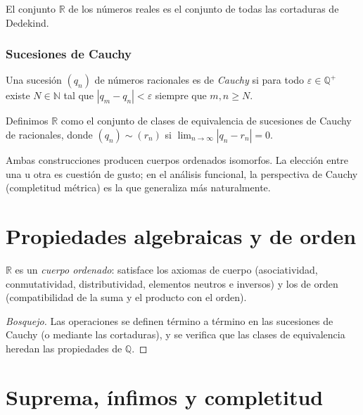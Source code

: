 \begin{definition}
\label{def:reales-dedekind}
El conjunto $\mathbb{R}$ de los números reales es el conjunto de todas las cortaduras de Dedekind.
\end{definition}

\subsubsection{Sucesiones de Cauchy}

\begin{definition}
\label{def:cauchy-racionales}
Una sucesión $(q_n)$ de números racionales es de \emph{Cauchy} si para todo $\varepsilon\in\mathbb{Q}^+$ existe $N\in\mathbb{N}$ tal que $|q_m-q_n|<\varepsilon$ siempre que $m,n\geq N$.
\end{definition}

\begin{definition}
\label{def:reales-cantor}
Definimos $\mathbb{R}$ como el conjunto de clases de equivalencia de sucesiones de Cauchy de racionales, donde $(q_n)\sim (r_n)$ si $\lim_{n\to\infty}|q_n-r_n|=0$.
\end{definition}

Ambas construcciones producen cuerpos ordenados isomorfos. La elección entre una u otra es cuestión de gusto; en el análisis funcional, la perspectiva de Cauchy (completitud métrica) es la que generaliza más naturalmente.

\section{Propiedades algebraicas y de orden}

\begin{theorem}
\label{teo:cuerpo-ordenado}
$\mathbb{R}$ es un \emph{cuerpo ordenado}: satisface los axiomas de cuerpo (asociatividad, conmutatividad, distributividad, elementos neutros e inversos) y los de orden (compatibilidad de la suma y el producto con el orden).
\end{theorem}

\begin{proof}[Bosquejo]
Las operaciones se definen término a término en las sucesiones de Cauchy (o mediante las cortaduras), y se verifica que las clases de equivalencia heredan las propiedades de $\mathbb{Q}$.
\end{proof}

\section{Suprema, ínfimos y completitud}

